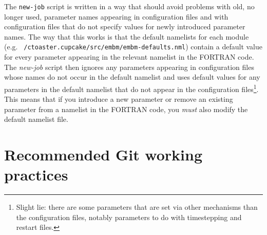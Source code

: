 \documentclass[a4paper,10pt,article]{memoir}
\begin{document}
The \texttt{new-job} script is written in a way that should avoid
problems with old, no longer used, parameter names appearing in
configuration files and with configuration files that do not specify
values for newly introduced parameter names.  The way that this works
is that the default namelists for each module
(e.g. \texttt{~/ctoaster.cupcake/src/embm/embm-defaults.nml}) contain a default
value for every parameter appearing in the relevant namelist in the
FORTRAN code.  The \emph{new-job} script then ignores any parameters
appearing in configuration files whose names do not occur in the
default namelist and uses default values for any parameters in the
default namelist that do not appear in the configuration
files\footnote{Slight lie: there are some parameters that are set via
  other mechanisms than the configuration files, notably parameters to
  do with timestepping and restart files.}.  This means that if you
introduce a new parameter or remove an existing parameter from a
namelist in the FORTRAN code, you \emph{must} also modify the default
namelist file.

\section{Recommended Git working practices}
\label{sec:git-practices}
\end{document}
